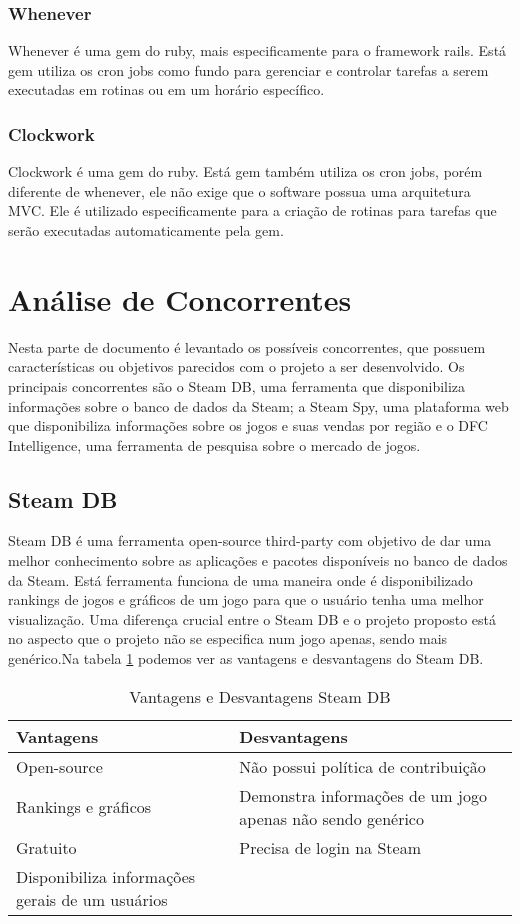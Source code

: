 \subsubsection*{Whenever}
Whenever é uma gem do ruby, mais especificamente para o framework rails. Está gem utiliza os cron jobs como fundo para gerenciar e controlar tarefas a serem executadas em rotinas ou em um horário específico\cite{whenever}.
\subsubsection*{Clockwork}
Clockwork é uma gem do ruby. Está gem também utiliza os cron jobs, porém diferente de whenever, ele não exige que o software possua uma arquitetura MVC. Ele é utilizado especificamente para a criação de rotinas para tarefas que serão executadas automaticamente pela gem\cite{clockwork}.
\section{Análise de Concorrentes}
Nesta parte de documento é levantado os possíveis concorrentes, que possuem características ou objetivos parecidos com o projeto a ser desenvolvido. Os principais concorrentes são o Steam DB, uma ferramenta que disponibiliza informações sobre o banco de dados da Steam; a Steam Spy, uma plataforma web que disponibiliza informações sobre os jogos e suas vendas por região e o DFC Intelligence, uma ferramenta de pesquisa sobre o mercado de jogos.
\subsection{Steam DB}
Steam DB é uma ferramenta open-source third-party com objetivo de dar uma melhor conhecimento sobre as aplicações e pacotes disponíveis no banco de dados da Steam\cite{steam_db}. Está ferramenta funciona de uma maneira onde é disponibilizado rankings de jogos e gráficos de um jogo para que o usuário tenha uma melhor visualização. Uma diferença crucial entre o Steam DB e o projeto proposto está no aspecto que o projeto não se especifica num jogo apenas, sendo mais genérico.Na tabela \ref{table:steam_db} podemos ver as vantagens e desvantagens do Steam DB.
\begin{table}
\centering
\begin{tabular}{|p{7cm}|p{7cm}|}
\hline \textbf{Vantagens} & \textbf{Desvantagens} \\
\hline Open-source & Não possui política de contribuição \\
\hline Rankings e gráficos & Demonstra informações de um jogo apenas não sendo genérico \\
\hline Gratuito & Precisa de login na Steam \\
\hline Disponibiliza informações gerais de um usuários & \\
\hline
\end{tabular}
\caption{Vantagens e Desvantagens Steam DB}
\label{table:steam_db}
\end{table}
